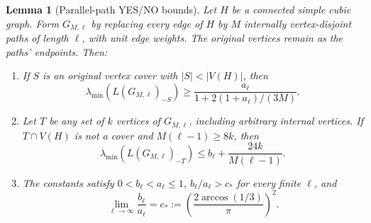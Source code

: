 \documentclass[11pt]{article}
\newtheorem{lemma}[theorem]{Lemma}
\begin{document}
\begin{lemma}[Parallel-path YES/NO bounds]\label{lem:pathamplification}
Let $H$ be a connected simple cubic graph. Form $G_{M,\ell}$ by
replacing every edge of $H$ by $M$ internally vertex-disjoint
paths of length $\ell$, with unit edge weights. The original
vertices remain as the paths' endpoints. Then:
\begin{enumerate}
\item If $S$ is an original vertex cover with $|S|<|V(H)|$, then
\begin{equation}\label{eq:pathyes}
 \lambda_{\min}(L(G_{M,\ell})_{-S})
 \geq\frac{a_\ell}{1+2(1+a_\ell)/(3M)}.
\end{equation}
\item Let $T$ be any set of $k$ vertices of $G_{M,\ell}$, including
arbitrary internal vertices. If $T\cap V(H)$ is not a cover and
$M(\ell-1)\geq8k$, then
\begin{equation}\label{eq:pathno}
 \lambda_{\min}(L(G_{M,\ell})_{-T})
 \leq b_\ell+\frac{24k}{M(\ell-1)}.
\end{equation}
\item The constants satisfy $0<b_\ell<a_\ell\leq1$,
$b_\ell/a_\ell>c_*$ for every finite $\ell$, and
\begin{equation}\label{eq:pathlimit}
 \lim_{\ell\to\infty}\frac{b_\ell}{a_\ell}
 =c_*:=\left(\frac{2\arccos(1/3)}{\pi}\right)^2.
\end{equation}
\end{enumerate}
\end{lemma}
\end{document}
